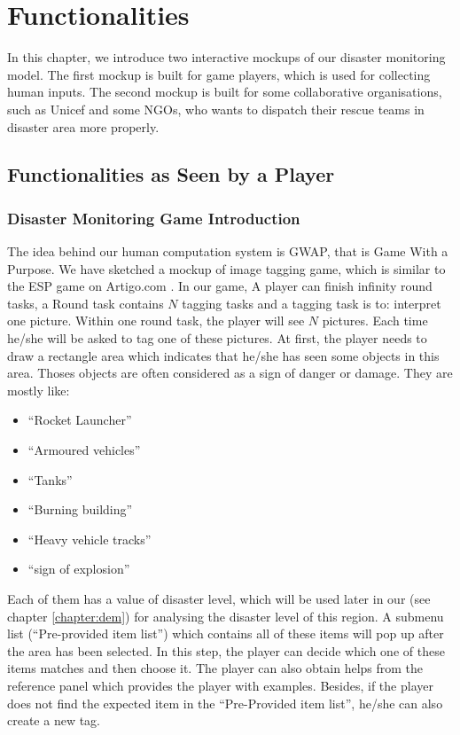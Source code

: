 \section{Functionalities}

In this chapter,
we introduce two interactive mockups of our disaster monitoring model.
The first mockup is built for game players,
which is used for collecting human inputs.
The second mockup is built for some collaborative organisations,
such as Unicef and some NGOs,
who wants to dispatch their rescue teams in disaster area more properly. 

  \subsection{Functionalities as Seen by a Player}
      \subsubsection{Disaster Monitoring Game Introduction}
      The idea behind our human computation system is GWAP,
      that is Game With a Purpose.
      We have sketched a mockup of image tagging game,
      which is similar to the ESP game on Artigo.com \cite{wieser2013artigo}.
      In our game,
      A player can finish infinity round tasks, 
      a Round task contains $N$ tagging tasks and a tagging task is to:
      interpret one picture.
      Within one round task, the player will see $N$ pictures.
      Each time he/she will be asked to tag one of these pictures.
      At first,
      the player needs to draw a rectangle area which indicates that he/she has seen some objects in this area.
      Thoses objects are often considered as a sign of danger or damage.
      They are mostly like:
      
      \begin{itemize}
        \item ``Rocket Launcher''
        \item ``Armoured vehicles''
        \item ``Tanks''
        \item ``Burning building''
        \item ``Heavy vehicle tracks''
        \item ``sign of explosion''
      \end{itemize}

      Each of them has a value of disaster level, 
      which will be used later in our (see chapter \ref{chapter:dem}) for analysing the disaster level of this region.
      A submenu list (``Pre-provided item list'') which contains all of these items will pop up after the area has been selected.
      In this step,
      the player can decide which one of these items matches and then choose it.
      The player can also obtain helps from the reference panel which provides the player with examples.
      Besides, 
      if the player does not find the expected item in the ``Pre-Provided item list'',
      he/she can also create a new tag.

